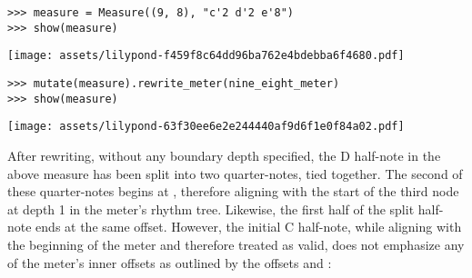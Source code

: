\begin{comment}
<abjad>
measure = Measure((9, 8), "c'2 d'2 e'8")
show(measure)
</abjad>
\end{comment}

\begin{abjadbookoutput}
\begin{singlespacing}
\vspace{-0.5\baselineskip}
\begin{verbatim}
>>> measure = Measure((9, 8), "c'2 d'2 e'8")
>>> show(measure)
\end{verbatim}
\noindent\texttt{[image: assets/lilypond-f459f8c64dd96ba762e4bdebba6f4680.pdf]}
\end{singlespacing}
\end{abjadbookoutput}

\begin{comment}
<abjad>
mutate(measure).rewrite_meter(nine_eight_meter)
show(measure)
</abjad>
\end{comment}

\begin{abjadbookoutput}
\begin{singlespacing}
\vspace{-0.5\baselineskip}
\begin{verbatim}
>>> mutate(measure).rewrite_meter(nine_eight_meter)
>>> show(measure)
\end{verbatim}
\noindent\texttt{[image: assets/lilypond-63f30ee6e2e244440af9d6f1e0f84a02.pdf]}
\end{singlespacing}
\end{abjadbookoutput}

\noindent After rewriting, without any boundary depth specified, the D
half-note in the above  measure has been split into two
quarter-notes, tied together. The second of these quarter-notes begins at
, therefore aligning with the start of the third  node
at depth 1 in the  meter's rhythm tree. Likewise, the first half of
the split half-note ends at the same  offset. However, the initial
C half-note, while aligning with the beginning of the meter and therefore
treated as valid, does not emphasize any of the meter's inner offsets as
outlined by the offsets  and :

\begin{comment}
<abjad>
measure = Measure((9, 8), "c'2 d'2 e'8")
mutate(measure).rewrite_meter(
    nine_eight_meter,
    boundary_depth=1,
    )
show(measure)
</abjad>
\end{comment}

